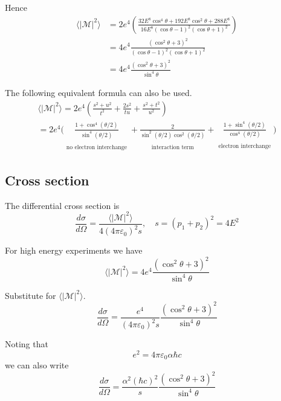 \documentclass[12pt]{article}
\begin{document}
Hence
\begin{align*}
\langle|\mathcal{M}|^2\rangle
&=2e^4
\left(
\frac{32E^8\cos^4\theta+192E^8\cos^2\theta+288E^8}{16E^8(\cos\theta-1)^2(\cos\theta+1)^2}
\right)
\\
&=4e^4\frac{\left(\cos^2\theta+3\right)^2}{(\cos\theta-1)^2(\cos\theta+1)^2}
\\
&=4e^4
\frac{(\cos^2\theta+3)^2}{\sin^4\theta}
\end{align*}

The following equivalent formula can also be used.
\begin{multline*}
\langle|\mathcal{M}|^2\rangle
=2e^4
\left(
\frac{s^2+u^2}{t^2}+\frac{2s^2}{tu}+\frac{s^2+t^2}{u^2}
\right)
\\
=2e^4\biggl(
\underset{\substack{\\[1ex]\text{no electron interchange}}}
{\frac{1+\cos^4(\theta/2)}{\sin^4(\theta/2)}}
+
\underset{\substack{\\[1ex]\text{interaction term}}}
{\frac{2}{\sin^2(\theta/2)\cos^2(\theta/2)}}
+
\underset{\substack{\\[1ex]\text{electron interchange}}}
{\frac{1+\sin^4(\theta/2)}{\cos^4(\theta/2)}}
\biggr)
\end{multline*}

\subsection*{Cross section}
The differential cross section is
\begin{equation*}
\frac{d\sigma}{d\Omega}=\frac{\langle|\mathcal{M}|^2\rangle}{4(4\pi\varepsilon_0)^2s},
\quad s=(p_1+p_2)^2=4E^2
\end{equation*}

For high energy experiments we have
\begin{equation*}
\langle|\mathcal{M}|^2\rangle=4e^4\frac{(\cos^2\theta+3)^2}{\sin^4\theta}
\end{equation*}

Substitute for $\langle|\mathcal{M}|^2\rangle$.
\begin{equation*}
\frac{d\sigma}{d\Omega}=\frac{e^4}{(4\pi\varepsilon_0)^2s}\frac{(\cos^2\theta+3)^2}{\sin^4\theta}
\end{equation*}

Noting that
\begin{equation*}
e^2=4\pi\varepsilon_0\alpha\hbar c
\end{equation*}
we can also write
\begin{equation*}
\frac{d\sigma}{d\Omega}=\frac{\alpha^2(\hbar c)^2}{s}
\frac{(\cos^2\theta+3)^2}{\sin^4\theta}
\end{equation*}
\end{document}
